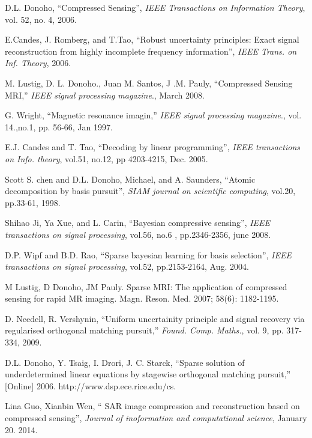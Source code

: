 \documentclass[11pt,conference]{IEEEtran}
\begin{document}
\begin{thebibliography}{60}
 D.L. Donoho, ``Compressed Sensing'', \emph{IEEE Transactions on Information Theory}, vol. 52, no. 4, 2006.

 E.Candes, J. Romberg, and T.Tao, ``Robust uncertainty principles: Exact signal reconstruction from highly incomplete frequency
information'', \emph{IEEE Trans. on Inf. Theory}, 2006.

 M. Lustig, D. L. Donoho., Juan M. Santos, J .M. Pauly, ``Compressed Sensing MRI,'' \emph{IEEE signal processing magazine}., March 2008.

 G. Wright, ``Magnetic resonance imagin,'' \emph{IEEE signal processing magazine}., vol. 14.,no.1, pp. 56-66, Jan 1997. 

 E.J. Candes and T. Tao, ``Decoding by linear programming'', \emph{IEEE transactions on Info. theory}, vol.51, no.12, pp 
4203-4215, Dec. 2005.

 Scott S. chen and D.L. Donoho, Michael, and A. Saunders, ``Atomic decomposition by basis pursuit'', \emph{SIAM journal
on scientific computing}, vol.20, pp.33-61, 1998.

 Shihao Ji, Ya Xue, and L. Carin, ``Bayesian compressive sensing'', \emph{IEEE transactions on signal processing}, vol.56, no.6
 , pp.2346-2356, june 2008.

 D.P. Wipf and B.D. Rao, ``Sparse bayesian learning for basis selection'', \emph{IEEE transactions on signal processing}, 
vol.52, pp.2153-2164, Aug. 2004.

 M Lustig, D Donoho, JM Pauly. Sparse MRI: The application of compressed sensing for rapid MR imaging. Magn. Reson. Med. 2007; 58(6): 1182-1195.

 D. Needell, R. Vershynin, ``Uniform uncertainity principle and signal recovery via regularised orthogonal matching pursuit,'' \emph{Found. Comp. Maths.}, vol. 9, pp. 317-334, 2009.

 D.L. Donoho, Y. Tsaig, I. Drori, J. C. Starck, ``Sparse solution of underdetermined linear equations by stagewise orthogonal matching pursuit,'' [Online] 2006. http://www.dsp.ece.rice.edu/cs.
  


 Lina Guo, Xianbin Wen, `` SAR image compression and reconstruction based on compressed sensing'', \emph{Journal of inoformation and computational science}, January 20. 2014.


\end{thebibliography}
\end{document}
